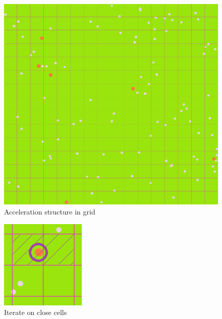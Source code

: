 \documentclass{article}
\begin{document}
\begin{figure}[H]
	\centering
	\includegraphics[scale=0.2]{figures/grid.png}
	\caption{Acceleration structure in grid}
\end{figure}

\begin{figure}[H]
	\centering
	\includegraphics[scale=1]{figures/detection.png}
	\caption{Iterate on close cells}
\end{figure}
\end{document}
